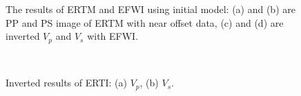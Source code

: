 \begin{figure}[!htb]
   \centering
   \\
   \\
   \caption{The results of ERTM and EFWI using initial model: (a) and (b) are PP and
   PS image of ERTM with near offset data, (c) and (d) are inverted $V_p$ and $V_s$
   with EFWI.}
   \label{fig:Results_init}
\end{figure}
\begin{figure}[!htb]
   \centering
   \\
   \caption{Inverted results of ERTI: (a) $V_p$, (b) $V_s$.}
   \label{fig:InvertedModel_ERTI}
\end{figure}
